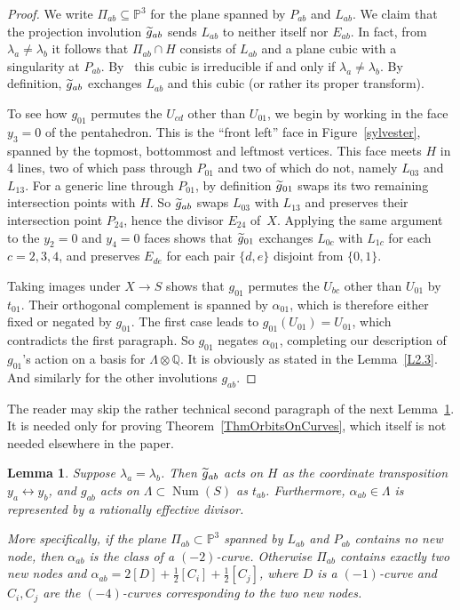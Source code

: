 \documentclass[11pt]{article}
\newtheorem{lemm}[theo]{Lemma}
\theoremstyle{definition}
\numberwithin{equation}{section}
\numberwithin{figure}{section}
\numberwithin{table}{section}
\let\oldtilde\tilde
\renewcommand*\tilde[1]{\mathchoice{\widetilde{#1}}{\widetilde{#1}}{\oldtilde{#1}}{\oldtilde{#1}}}
\newcommand*\gtilde{\tilde g}
\newcommand*\sset{\subset}
\newcommand*\tensor{\otimes}
\newcommand{\bbP}{{\mathbb{P}}}
\newcommand{\bbQ}{{\mathbb{Q}}}
\DeclareMathOperator{\Num}{Num}
\begin{document}
\begin{proof}
We write $\Pi_{ab}\subseteq\bbP^3$ for the plane spanned by $P_{ab}$ and $L_{ab}$. We claim that the projection involution $\gtilde_{ab}$ sends $L_{ab}$ to neither itself nor $E_{ab}$. In fact, from $\lambda_a\neq\lambda_b$ it follows that $\Pi_{ab}\cap H$ consists of $L_{ab}$ and a plane cubic with a singularity at $P_{ab}$. By~\cite[Lemma~4.6]{DolgachevSalem} this cubic is irreducible if and only if $\lambda_a\ne\lambda_b$. By definition, $\gtilde_{ab}$ exchanges $L_{ab}$ and this cubic (or rather its proper transform).

To see how $g_{01}$ permutes the $U_{cd}$ other than $U_{01}$, we begin by working in the face $y_3=0$ of the pentahedron. This is the ``front left'' face in Figure~\ref{sylvester}, spanned by the topmost, bottommost and leftmost vertices. This face meets $H$ in 4 lines, two of which pass through $P_{01}$ and two of which do not, namely $L_{03}$ and $L_{13}$. For a generic line through $P_{01}$, by definition $\gtilde_{01}$ swaps its two remaining intersection points with $H$. So $\gtilde_{ab}$ swaps $L_{03}$ with $L_{13}$ and preserves their intersection point $P_{24}$, hence the divisor $E_{24}$ of~$X$. Applying the same argument to the $y_2=0$ and $y_4=0$ faces shows that $\gtilde_{01}$ exchanges $L_{0c}$ with $L_{1c}$ for each $c=2,3,4$, and preserves $E_{de}$ for each pair $\{d,e\}$ disjoint from $\{0,1\}$.

Taking images under $X\to S$ shows that $g_{01}$ permutes the $U_{bc}$ other than $U_{01}$ by $t_{01}$. Their orthogonal complement is spanned by $\alpha_{01}$, which is therefore either fixed or negated by $g_{01}$. The first case leads to $g_{01}(U_{01})=U_{01}$, which contradicts the first paragraph. So $g_{01}$ negates $\alpha_{01}$, completing our description of $g_{01}$'s action on a basis for $\Lambda\tensor\bbQ$. It is obviously as stated in the Lemma~\ref{L2.3}. And similarly for the other involutions $g_{ab}$.
\end{proof}

The reader may skip the rather technical second paragraph of the next Lemma~\ref{lem:alphaab}. It is needed only for proving Theorem~\ref{ThmOrbitsOnCurves}, which itself is not needed elsewhere in the paper.

\begin{lemm}\label{lem:alphaab}
Suppose $\lambda_a=\lambda_b$. Then $\gtilde_{ab}$ acts on $H$ as the coordinate transposition $y_a\leftrightarrow y_b$, and $g_{ab}$ acts on $\Lambda\sset\Num(S)$ as $t_{ab}$. Furthermore, $\alpha_{ab}\in\Lambda$ is represented by a rationally effective divisor.

More specifically, if the plane $\Pi_{ab}\sset\bbP^3$ spanned by $L_{ab}$ and $P_{ab}$ contains no new node, then $\alpha_{ab}$ is the class of a $(-2)$-curve. Otherwise $\Pi_{ab}$ contains exactly two new nodes and $\alpha_{ab}=2[D]+\frac12[C_i]+\frac12[C_j]$, where $D$ is a $(-1)$-curve and $C_i,C_j$ are the $(-4)$-curves corresponding to the two new nodes.
\end{lemm}
\end{document}
